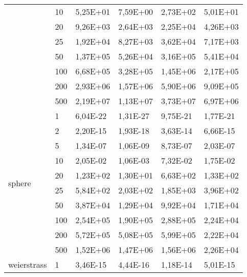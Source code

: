 \begin{longtable}[c]{|p{3.5cm}|l|l|l|l|l|}
                                       & 10        & 5,25E+01 & 7,59E+00 & 2,73E+02 & 5,01E+01 \\ \cline{2-6} 
                                       & 20        & 9,26E+03 & 2,64E+03 & 2,25E+04 & 4,26E+03 \\ \cline{2-6} 
                                       & 25        & 1,92E+04 & 8,27E+03 & 3,62E+04 & 7,17E+03 \\ \cline{2-6} 
                                       & 50        & 1,37E+05 & 5,26E+04 & 3,16E+05 & 5,41E+04 \\ \cline{2-6} 
                                       & 100       & 6,68E+05 & 3,28E+05 & 1,45E+06 & 2,17E+05 \\ \cline{2-6} 
                                       & 200       & 2,93E+06 & 1,57E+06 & 5,90E+06 & 9,09E+05 \\ \cline{2-6} 
                                       & 500       & 2,19E+07 & 1,13E+07 & 3,73E+07 & 6,97E+06 \\ \hline
\multirow[t]{10}{*}{sphere}               & 1         & 6,04E-22 & 1,31E-27 & 9,75E-21 & 1,77E-21 \\ \cline{2-6} 
                                       & 2         & 2,20E-15 & 1,93E-18 & 3,63E-14 & 6,66E-15 \\ \cline{2-6} 
                                       & 5         & 1,34E-07 & 1,06E-09 & 8,73E-07 & 2,03E-07 \\ \cline{2-6} 
                                       & 10        & 2,05E-02 & 1,06E-03 & 7,32E-02 & 1,75E-02 \\ \cline{2-6} 
                                       & 20        & 1,23E+02 & 1,30E+01 & 6,63E+02 & 1,33E+02 \\ \cline{2-6} 
                                       & 25        & 5,84E+02 & 2,03E+02 & 1,85E+03 & 3,96E+02 \\ \cline{2-6} 
                                       & 50        & 3,87E+04 & 1,29E+04 & 9,92E+04 & 1,71E+04 \\ \cline{2-6} 
                                       & 100       & 2,54E+05 & 1,90E+05 & 2,88E+05 & 2,24E+04 \\ \cline{2-6} 
                                       & 200       & 5,72E+05 & 5,08E+05 & 5,99E+05 & 2,22E+04 \\ \cline{2-6} 
                                       & 500       & 1,52E+06 & 1,47E+06 & 1,56E+06 & 2,26E+04 \\ \hline
\multirow[t]{10}{*}{weierstrass}          & 1         & 3,46E-15 & 4,44E-16 & 1,18E-14 & 5,01E-15 \\ \cline{2-6} 

\end{longtable}
